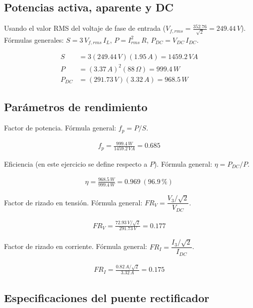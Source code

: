 \documentclass[11pt]{article}
\begin{document}
\subsection{Potencias activa, aparente y DC}

Usando el valor RMS del voltaje de fase de entrada
($V_{f,rms} = \frac{352.76}{\sqrt{2}} = 249.44\,V$). F\'ormulas generales:
$S = 3\,V_{f,rms}\,I_L$, \quad $P = I_{rms}^2\,R$, \quad $P_{DC} = V_{DC}\,I_{DC}$.

\begin{align*}
S &= 3(249.44\,V)(1.95\,A) = \boxed{1459.2\,VA} \\
P &= (3.37\,A)^2(88\,\Omega) = \boxed{999.4\,W} \\
P_{DC} &= (291.73\,V)(3.32\,A) = \boxed{968.5\,W}
\end{align*}

\subsection{Par\'ametros de rendimiento}

Factor de potencia. F\'ormula general: $f_p = P/S$.

\begin{align*}
f_p = \frac{999.4\,W}{1459.2\,VA} = \boxed{0.685}
\end{align*}

Eficiencia (en este ejercicio se define respecto a $P$). F\'ormula general:
$\eta = P_{DC}/P$.

\begin{align*}
\eta = \frac{968.5\,W}{999.4\,W} = \boxed{0.969}\ (96.9\,\%)
\end{align*}

Factor de rizado en tensi\'on. F\'ormula general: $FR_V = \dfrac{V_3/\sqrt{2}}{V_{DC}}$.

\begin{align*}
FR_V = \frac{72.93\,V/\sqrt{2}}{291.73\,V} = \boxed{0.177}
\end{align*}

Factor de rizado en corriente. F\'ormula general: $FR_I = \dfrac{I_3/\sqrt{2}}{I_{DC}}$.

\begin{align*}
FR_I = \frac{0.82\,A/\sqrt{2}}{3.32\,A} = \boxed{0.175}
\end{align*}

\subsection{Especificaciones del puente rectificador}
\end{document}
